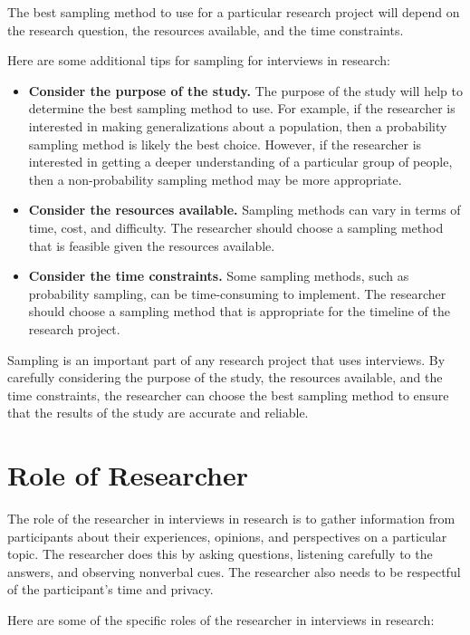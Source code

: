 \documentclass[
  b5paper]{book}
\begin{document}
The best sampling method to use for a particular research project will depend on the research question, the resources available, and the time constraints.

Here are some additional tips for sampling for interviews in research:

\begin{itemize}
\item
  \textbf{Consider the purpose of the study.} The purpose of the study will help to determine the best sampling method to use. For example, if the researcher is interested in making generalizations about a population, then a probability sampling method is likely the best choice. However, if the researcher is interested in getting a deeper understanding of a particular group of people, then a non-probability sampling method may be more appropriate.
\item
  \textbf{Consider the resources available.} Sampling methods can vary in terms of time, cost, and difficulty. The researcher should choose a sampling method that is feasible given the resources available.
\item
  \textbf{Consider the time constraints.} Some sampling methods, such as probability sampling, can be time-consuming to implement. The researcher should choose a sampling method that is appropriate for the timeline of the research project.
\end{itemize}

Sampling is an important part of any research project that uses interviews. By carefully considering the purpose of the study, the resources available, and the time constraints, the researcher can choose the best sampling method to ensure that the results of the study are accurate and reliable.

\hypertarget{role-of-researcher}{%
\section{Role of Researcher}\label{role-of-researcher}}

The role of the researcher in interviews in research is to gather information from participants about their experiences, opinions, and perspectives on a particular topic. The researcher does this by asking questions, listening carefully to the answers, and observing nonverbal cues. The researcher also needs to be respectful of the participant's time and privacy.

Here are some of the specific roles of the researcher in interviews in research:
\end{document}
